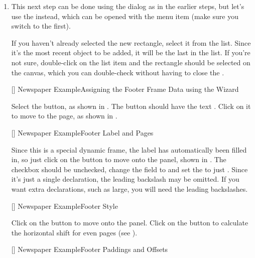 \begin{enumerate}
\item This next step can be done using the 
dialog as in the earlier steps, but let's use the 
instead, which can be opened with the 
menu item (make sure you switch to the  first).

If you haven't already selected the new rectangle, select it from
the  list. Since it's the most
recent object to be added, it will be the last in the list. If
you're not sure, double-click on the list item and the rectangle
should be selected on the \gls{canvas}, which you can double-check
without having to close the .

[]
{}
{Newspaper Example\dash Assigning the Footer Frame Data using the
Wizard}

Select the  button, as shown in 
. The  button should have
the text . Click on it to move to
the  page, as shown in .

[]
{}
{Newspaper Example\dash Footer Label and Pages}

Since this is a special dynamic frame, the label has automatically
been filled in, so just click on the  button to
move onto the  panel, shown in
. The  checkbox
should be unchecked, change the 
field to  and set the 
to just . Since it's just a single declaration, the
leading backslash may be omitted. If you want extra declarations,
such as \gls{large}, you will need the leading backslashes.

[]
{}
{Newspaper Example\dash Footer Style}

Click on the  button to
move onto the  panel.
Click on the 
button to calculate the horizontal shift for even pages
(see ).

[]
{}
{Newspaper Example\dash Footer Paddings and Offsets}


\end{enumerate}
